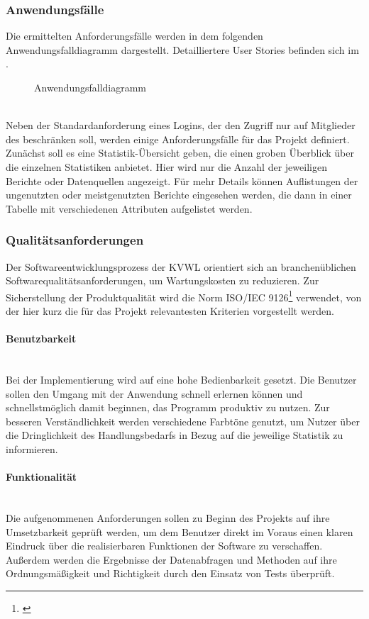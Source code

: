 \subsubsection{Anwendungsfälle}
\label{sec:Anwendungsfaelle}
Die ermittelten Anforderungsfälle werden in dem folgenden Anwendungsfalldiagramm dargestellt. Detailliertere User Stories befinden sich im .
\begin{figure}[htb]
	\centering
	\caption{Anwendungsfalldiagramm}
	\label{fig:Anwendungsfalldiagramm}
\end{figure}\\
Neben der Standardanforderung eines Logins, der den Zugriff nur auf Mitglieder des \teamName beschränken soll, werden einige Anforderungsfälle für das Projekt definiert. Zunächst soll es eine Statistik-Übersicht geben, die einen groben Überblick über die einzelnen Statistiken anbietet. Hier wird nur die Anzahl der jeweiligen Berichte oder Datenquellen angezeigt. Für mehr Details können Auflistungen \zB der ungenutzten oder meistgenutzten Berichte eingesehen werden, 
die dann in einer Tabelle mit verschiedenen Attributen aufgelistet werden.

\subsubsection{Qualitätsanforderungen}
\label{sec:Qualitaetsanforderungen}
Der Softwareentwicklungsprozess der \ac{KVWL} orientiert sich an branchenüblichen Softwarequalitätsanforderungen, um Wartungskosten zu reduzieren. Zur Sicherstellung der Produktqualität wird die Norm ISO/IEC 9126\footnote{\cite{ISO9126}} verwendet, von der hier kurz die für das Projekt relevantesten Kriterien vorgestellt werden.

\paragraph{Benutzbarkeit} ~\\
\label{p:Benutzbarkeit}
Bei der Implementierung wird auf eine hohe Bedienbarkeit gesetzt. Die Benutzer sollen den Umgang mit der Anwendung schnell erlernen können und schnellstmöglich damit beginnen, das Programm produktiv zu nutzen. Zur besseren Verständlichkeit werden verschiedene Farbtöne genutzt, um Nutzer über die Dringlichkeit des Handlungsbedarfs in Bezug auf die jeweilige Statistik zu informieren.

\paragraph{Funktionalität} ~\\
\label{p:Funktionalitaet}
Die aufgenommenen Anforderungen sollen zu Beginn des Projekts auf ihre Umsetzbarkeit geprüft werden, um dem Benutzer direkt im Voraus einen klaren Eindruck über die realisierbaren Funktionen der Software zu verschaffen. Außerdem werden die Ergebnisse der Datenabfragen und Methoden auf ihre Ordnungsmäßigkeit und Richtigkeit durch den Einsatz von Tests überprüft.

